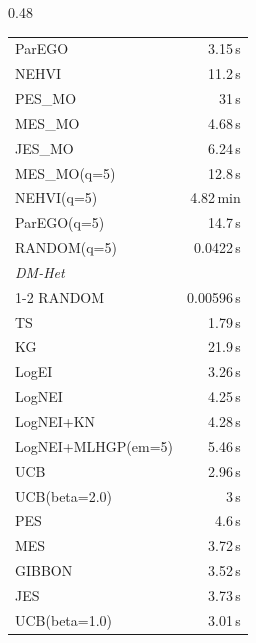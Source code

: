 \begin{table}[h]
\begin{subtable}[t]{0.48\textwidth}
\begin{tabular}{lr}
      ParEGO & 3.15\,s \\
      NEHVI & 11.2\,s \\
      PES\_MO & 31\,s \\
      MES\_MO & 4.68\,s \\
      JES\_MO & 6.24\,s \\
      MES\_MO(q=5) & 12.8\,s \\
      NEHVI(q=5) & 4.82\,min \\
      ParEGO(q=5) & 14.7\,s \\
      RANDOM(q=5) & 0.0422\,s \\
      \midrule
      \multicolumn{2}{l}{\textit{DM-Het}} \\
      \cmidrule{1-2}
      RANDOM & 0.00596\,s \\
      TS & 1.79\,s \\
      KG & 21.9\,s \\
      LogEI & 3.26\,s \\
      LogNEI & 4.25\,s \\
      LogNEI+KN & 4.28\,s \\
      LogNEI+MLHGP(em=5) & 5.46\,s \\
      UCB & 2.96\,s \\
      UCB(beta=2.0) & 3\,s \\
      PES & 4.6\,s \\
      MES & 3.72\,s \\
      GIBBON & 3.52\,s \\
      JES & 3.73\,s \\
      UCB(beta=1.0) & 3.01\,s \\
      \bottomrule
    \end{tabular}
  \end{subtable}
\end{table}
